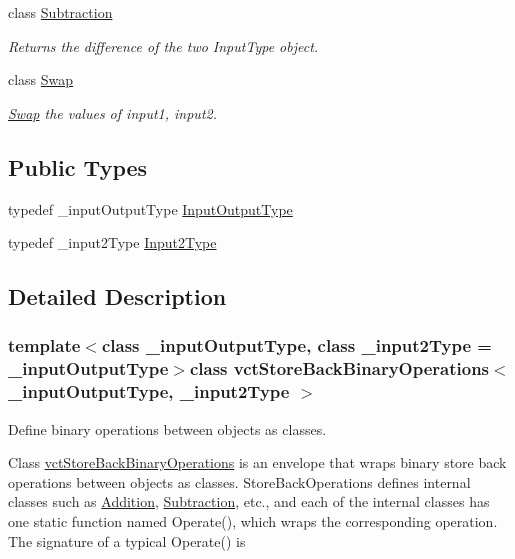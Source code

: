 \begin{DoxyCompactItemize}
class \hyperlink{classvct_store_back_binary_operations_1_1_subtraction}{Subtraction}
\begin{DoxyCompactList}\small\item\em Returns the difference of the two Input\-Type object. \end{DoxyCompactList}\item 
class \hyperlink{classvct_store_back_binary_operations_1_1_swap}{Swap}
\begin{DoxyCompactList}\small\item\em \hyperlink{classvct_store_back_binary_operations_1_1_swap}{Swap} the values of input1, input2. \end{DoxyCompactList}\end{DoxyCompactItemize}
\subsection*{Public Types}
\begin{DoxyCompactItemize}
\item 
typedef \-\_\-input\-Output\-Type \hyperlink{classvct_store_back_binary_operations_a9dc481d9e1345541dd5d833d5e5688f3}{Input\-Output\-Type}
\item 
typedef \-\_\-input2\-Type \hyperlink{classvct_store_back_binary_operations_a65a7197563c794a879fb50a406e70c8f}{Input2\-Type}
\end{DoxyCompactItemize}


\subsection{Detailed Description}
\subsubsection*{template$<$class \-\_\-input\-Output\-Type, class \-\_\-input2\-Type = \-\_\-input\-Output\-Type$>$class vct\-Store\-Back\-Binary\-Operations$<$ \-\_\-input\-Output\-Type, \-\_\-input2\-Type $>$}

Define binary operations between objects as classes. 

Class \hyperlink{classvct_store_back_binary_operations}{vct\-Store\-Back\-Binary\-Operations} is an envelope that wraps binary store back operations between objects as classes. Store\-Back\-Operations defines internal classes such as \hyperlink{classvct_store_back_binary_operations_1_1_addition}{Addition}, \hyperlink{classvct_store_back_binary_operations_1_1_subtraction}{Subtraction}, etc., and each of the internal classes has one static function named Operate(), which wraps the corresponding operation. The signature of a typical Operate() is


